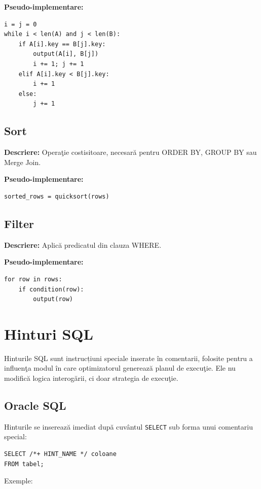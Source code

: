 \documentclass[12pt]{article}
\begin{document}
\textbf{Pseudo-implementare:}
\begin{verbatim}
i = j = 0
while i < len(A) and j < len(B):
    if A[i].key == B[j].key:
        output(A[i], B[j])
        i += 1; j += 1
    elif A[i].key < B[j].key:
        i += 1
    else:
        j += 1
\end{verbatim}

\subsection{Sort}
\textbf{Descriere:} Operaţie costisitoare, necesară pentru ORDER BY, GROUP BY sau Merge Join.

\textbf{Pseudo-implementare:}
\begin{verbatim}
sorted_rows = quicksort(rows)
\end{verbatim}

\subsection{Filter}
\textbf{Descriere:} Aplică predicatul din clauza WHERE.

\textbf{Pseudo-implementare:}
\begin{verbatim}
for row in rows:
    if condition(row):
        output(row)
\end{verbatim}

\section{Hinturi SQL}

Hinturile SQL sunt instrucțiuni speciale inserate în comentarii, folosite pentru a influenţa modul în care optimizatorul generează planul de execuţie. Ele nu modifică logica interogării, ci doar strategia de execuţie.

\subsection{Oracle SQL}

Hinturile se inserează imediat după cuvântul \texttt{SELECT} sub forma unui comentariu special:

\begin{verbatim}
SELECT /*+ HINT_NAME */ coloane
FROM tabel;
\end{verbatim}

Exemple:
\end{document}
